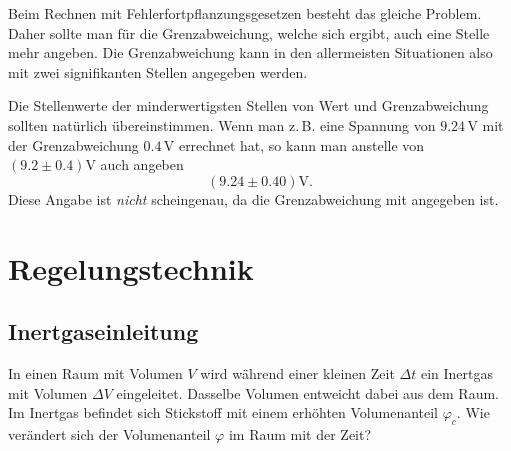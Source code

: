 \documentclass[a4paper,10pt,fleqn,twocolumn,twoside,dvipdfmx]{scrartcl}
\numberwithin{equation}{section}
\begin{document}
Beim Rechnen mit Fehlerfortpflanzungsgesetzen besteht das gleiche
Problem. Daher sollte man für die Grenzabweichung, welche sich ergibt,
auch eine Stelle mehr angeben. Die Grenzabweichung kann in den
allermeisten Situationen also mit zwei signifikanten Stellen angegeben
werden.

Die Stellenwerte der minderwertigsten Stellen von Wert und
Grenzabweichung sollten natürlich übereinstimmen.
Wenn man z.\,B. eine Spannung von $9.24\,\mathrm V$ mit der
Grenzabweichung $0.4\,\mathrm V$ errechnet hat, so kann man
anstelle von $(9.2\pm 0.4)\mathrm V$ auch angeben%
\begin{equation}
(9.24\pm 0.40)\mathrm V.
\end{equation}
Diese Angabe ist \textit{nicht} scheingenau, da die Grenzabweichung
mit angegeben ist.


\section{Regelungstechnik}
\subsection{Inertgaseinleitung}
In einen Raum mit Volumen $V$ wird während einer kleinen
Zeit $\Delta t$ ein Inertgas mit Volumen $\Delta V$ eingeleitet.
Dasselbe Volumen entweicht dabei aus dem Raum. Im Inertgas
befindet sich Stickstoff mit einem erhöhten Volumenanteil $\varphi_c$.
Wie verändert sich der Volumenanteil $\varphi$ im Raum mit der Zeit?
\end{document}
